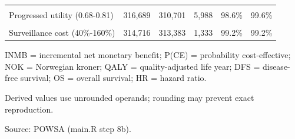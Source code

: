 \begin{table}[H]
{\begin{threeparttable}
\begin{tabular}[t]{lrrrrr}
\cellcolor[HTML]{F7F9FC}{\textcolor[HTML]{2D3748}{Progressed-disease cost (60\%-140\%)}} & \cellcolor[HTML]{F7F9FC}{\textcolor[HTML]{2D3748}{303,547}} & \cellcolor[HTML]{F7F9FC}{\textcolor[HTML]{2D3748}{322,236}} & \cellcolor[HTML]{F7F9FC}{\textcolor[HTML]{2D3748}{18,689}} & \cellcolor[HTML]{F7F9FC}{\textcolor[HTML]{2D3748}{99.6\%}} & \cellcolor[HTML]{F7F9FC}{\textcolor[HTML]{2D3748}{98.4\%}}\\
\textcolor[HTML]{2D3748}{Progressed utility (0.68-0.81)} & \textcolor[HTML]{2D3748}{316,689} & \textcolor[HTML]{2D3748}{310,701} & \textcolor[HTML]{2D3748}{5,988} & \textcolor[HTML]{2D3748}{98.6\%} & \textcolor[HTML]{2D3748}{99.6\%}\\
\cellcolor[HTML]{F7F9FC}{\textcolor[HTML]{2D3748}{End-of-life cost (60\%-140\%)}} & \cellcolor[HTML]{F7F9FC}{\textcolor[HTML]{2D3748}{311,205}} & \cellcolor[HTML]{F7F9FC}{\textcolor[HTML]{2D3748}{316,947}} & \cellcolor[HTML]{F7F9FC}{\textcolor[HTML]{2D3748}{5,742}} & \cellcolor[HTML]{F7F9FC}{\textcolor[HTML]{2D3748}{99.2\%}} & \cellcolor[HTML]{F7F9FC}{\textcolor[HTML]{2D3748}{99.2\%}}\\
\textcolor[HTML]{2D3748}{Surveillance cost (40\%-160\%)} & \textcolor[HTML]{2D3748}{314,716} & \textcolor[HTML]{2D3748}{313,383} & \textcolor[HTML]{2D3748}{1,333} & \textcolor[HTML]{2D3748}{99.2\%} & \textcolor[HTML]{2D3748}{99.2\%}\\
\bottomrule
\end{tabular}
\begin{tablenotes}
\item INMB = incremental net monetary benefit; P(CE) = probability cost-effective; NOK = Norwegian kroner; QALY = quality-adjusted life year; DFS = disease-free survival; OS = overall survival; HR = hazard ratio.
\item Derived values use unrounded operands; rounding may prevent exact reproduction.
\item Source: POWSA (main.R step 8b).
\end{tablenotes}
\end{threeparttable}
}
\end{table}
